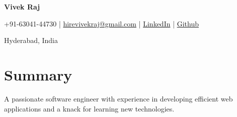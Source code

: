 \documentclass[a4paper,11pt]{article}
\newcommand{\headerfontiii}{\fontfamily{ppl}\selectfont}
\begin{document}
\headerfontiii

\begin{center}
    {\Huge\textbf{Vivek Raj}}
\end{center}
\vspace{-6mm}

\begin{center}
    \small{
    +91-63041-44730 | \href{mailto:hirevivekraj@gmail.com}{hirevivekraj@gmail.com} | 
    \href{https://www.linkedin.com/in/vivekraj}{LinkedIn} | 
    \href{https://github.com/vivekraj}{Github}
    }
\end{center}
\vspace{-6mm}

\begin{center}
    \small{
    Hyderabad, India
    }
\end{center}

\vspace{-4mm}

\section{\textbf{Summary}}
\vspace{1mm}
\small{
A passionate software engineer with experience in developing efficient web applications and a knack for
learning new technologies.
}
\vspace{-2mm}
\end{document}
